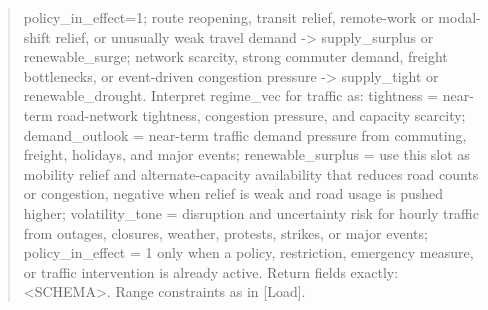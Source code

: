 \documentclass{article}
\begin{document}
\begin{quote}
policy\_in\_effect=1; route reopening, transit relief, remote-work or modal-shift relief, or unusually weak travel demand -> supply\_surplus or renewable\_surge; network scarcity, strong commuter demand, freight bottlenecks, or event-driven congestion pressure -> supply\_tight or renewable\_drought. Interpret regime\_vec for traffic as: tightness = near-term road-network tightness, congestion pressure, and capacity scarcity; demand\_outlook = near-term traffic demand pressure from commuting, freight, holidays, and major events; renewable\_surplus = use this slot as mobility relief and alternate-capacity availability that reduces road counts or congestion, negative when relief is weak and road usage is pushed higher; volatility\_tone = disruption and uncertainty risk for hourly traffic from outages, closures, weather, protests, strikes, or major events; policy\_in\_effect = 1 only when a policy, restriction, emergency measure, or traffic intervention is already active. Return fields exactly: <SCHEMA>. Range constraints as in [Load].
\end{quote}
\end{document}
